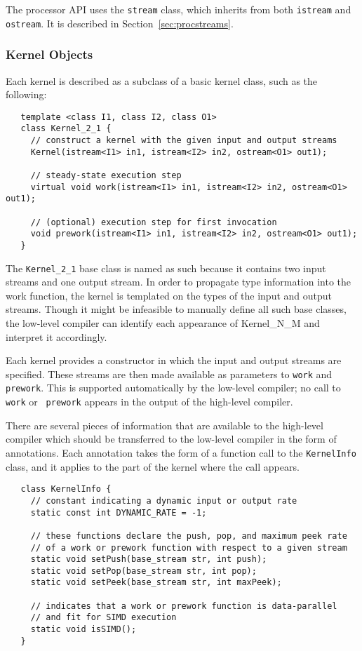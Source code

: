 The processor API uses the {\tt stream} class, which inherits from
both {\tt istream} and {\tt ostream}. It is described in
Section~\ref{sec:procstreams}.

\subsubsection{Kernel Objects}
\label{sec:kernels}

Each kernel is described as a subclass of a basic kernel class, such
as the following:
\begin{verbatim}
   template <class I1, class I2, class O1>
   class Kernel_2_1 {
     // construct a kernel with the given input and output streams
     Kernel(istream<I1> in1, istream<I2> in2, ostream<O1> out1);

     // steady-state execution step
     virtual void work(istream<I1> in1, istream<I2> in2, ostream<O1> out1);

     // (optional) execution step for first invocation
     void prework(istream<I1> in1, istream<I2> in2, ostream<O1> out1);
   }  
\end{verbatim}

The {\tt Kernel\_2\_1} base class is named as such because it contains
two input streams and one output stream.  In order to propagate type
information into the work function, the kernel is templated on the
types of the input and output streams.  Though it might be infeasible
to manually define all such base classes, the low-level compiler can
identify each appearance of Kernel\_N\_M and interpret it accordingly.

Each kernel provides a constructor in which the input and output
streams are specified.  These streams are then made available as
parameters to {\tt work} and {\tt prework}.  This is supported
automatically by the low-level compiler; no call to {\tt work} or {\tt
prework} appears in the output of the high-level compiler.


There are several pieces of information that are available to the
high-level compiler which should be transferred to the low-level
compiler in the form of annotations.  Each annotation takes the form
of a function call to the {\tt KernelInfo} class, and it applies to
the part of the kernel where the call appears.
\begin{verbatim}
   class KernelInfo {
     // constant indicating a dynamic input or output rate
     static const int DYNAMIC_RATE = -1;

     // these functions declare the push, pop, and maximum peek rate
     // of a work or prework function with respect to a given stream
     static void setPush(base_stream str, int push);
     static void setPop(base_stream str, int pop);
     static void setPeek(base_stream str, int maxPeek);

     // indicates that a work or prework function is data-parallel 
     // and fit for SIMD execution
     static void isSIMD();
   }  
\end{verbatim}

